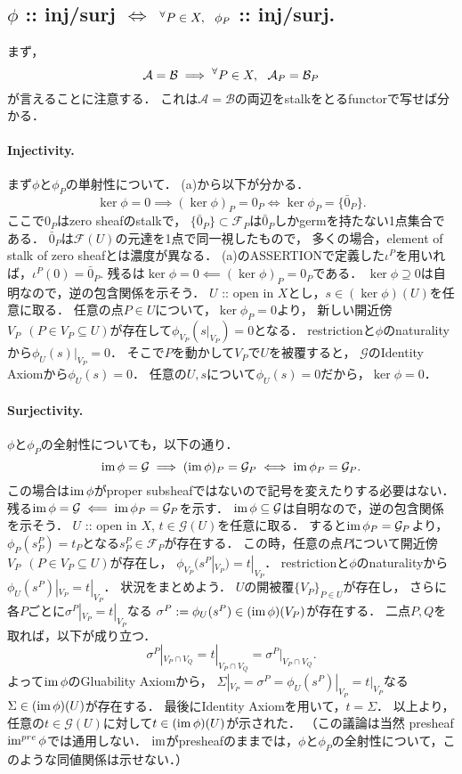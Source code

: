 \documentclass[a4paper]{jsarticle}
\newcommand{\shA}{\mathcal{A}}
\newcommand{\shB}{\mathcal{B}}
\newcommand{\shF}{\mathcal{F}}
\newcommand{\shG}{\mathcal{G}}
\begin{document}
    \subsection{$\phi$ :: inj/surj $\iff$ ${}^{\forall} P \in X,~~ \phi_P$ :: inj/surj.}
    まず，
    \[ \shA=\shB \implies \Forall{P \in X} \shA_P=\shB_P \]
    が言えることに注意する．
    これは$\shA=\shB$の両辺をstalkをとるfunctorで写せば分かる．

    \paragraph{Injectivity.}
    まず$\phi$と$\phi_P$の単射性について．
    (a)から以下が分かる．
    \[ \ker \phi=0 \implies (\ker \phi)_P=0_P \iff \ker \phi_P=\{\bar{0}_P\}. \]
    ここで$0_P$はzero sheafのstalkで，
    $\{\bar{0}_P\} \subset \shF_P$は$\bar{0}_P$しかgermを持たない1点集合である．
    $\bar{0}_P$は$\shF(U)$の元達を1点で同一視したもので，
    多くの場合，element of stalk of zero sheafとは濃度が異なる．
    (a)のASSERTIONで定義した$\iota^P$を用いれば，$\iota^P(0)=\bar{0}_P.$
    残るは$\ker \phi=0 \impliedby (\ker \phi)_P=0_P$である．
    $\ker \phi \supseteq 0$は自明なので，逆の包含関係を示そう．
    $U$ :: open in $X$とし，$s \in (\ker \phi)(U)$を任意に取る．
    任意の点$P \in U$について，$\ker \phi_P=0$より，
    新しい開近傍$V_P ~~(P \in V_P \subseteq U)$が存在して$\phi_{V_P}(s|_{V_P})=0$となる．
    restrictionと$\phi$のnaturalityから$\phi_U(s)|_{V_P}=0$．
    そこで$P$を動かして$V_P$で$U$を被覆すると，
    $\shG$のIdentity Axiomから$\phi_U(s)=0$．
    任意の$U, s$について$\phi_U(s)=0$だから，$\ker \phi=0$．

    \paragraph{Surjectivity.}
    $\phi$と$\phi_P$の全射性についても，以下の通り．
    \[ \im \phi=\shG \implies (\im \phi)_P=\shG_P \iff \im \phi_P=\shG_P. \]
    この場合は$\operatorname{im} \phi$がproper subsheafではないので記号を変えたりする必要はない．
    残る$\im \phi=\shG \impliedby \im \phi_P=\shG_P$を示す．
    $\im \phi \subseteq \shG$は自明なので，逆の包含関係を示そう．
    $U$ :: open in $X$, $t \in \shG(U)$を任意に取る．
    すると$\im \phi_P=\shG_P$より，$\phi_P(s^P_P)=t_P$となる$s^P_P \in \shF_P$が存在する．
    この時，任意の点$P$について開近傍$V_P ~~(P \in V_P \subseteq U)$が存在し，
    $\phi_{V_P}(s^P|_{V_P})=t|_{V_P}$．
    restrictionと$\phi$のnaturalityから$\phi_U(s^P)|_{V_P}=t|_{V_P}$．
    状況をまとめよう．
    $U$の開被覆$\{V_P\}_{P \in U}$が存在し，
    さらに各$P$ごとに$\sigma^P|_{V_P}=t|_{V_P}$なる
    $\sigma^P:=\phi_U(s^P) \in (\operatorname{im} \phi)(V_P)$が存在する．
    二点$P,Q$を取れば，以下が成り立つ．
    \[ \sigma^P|_{V_P \cap V_Q}=t|_{V_P \cap V_Q}=\sigma^P|_{V_P \cap V_Q}. \]
    よって$\operatorname{im} \phi$のGluability Axiomから，
    $\Sigma|_{V_P}=\sigma^P=\phi_U(s^P)|_{V_P}=t|_{V_P}$なる$\Sigma \in (\operatorname{im} \phi)(U)$が存在する．
    最後にIdentity Axiomを用いて，$t=\Sigma$．
    以上より，任意の$t \in \shG(U)$に対して$t \in (\operatorname{im} \phi)(U)$が示された．
    （この議論は当然 presheaf $\operatorname{im}^{pre} \phi$では通用しない．
    $\operatorname{im}$がpresheafのままでは，$\phi$と$\phi_P$の全射性について，このような同値関係は示せない．）
\end{document}
